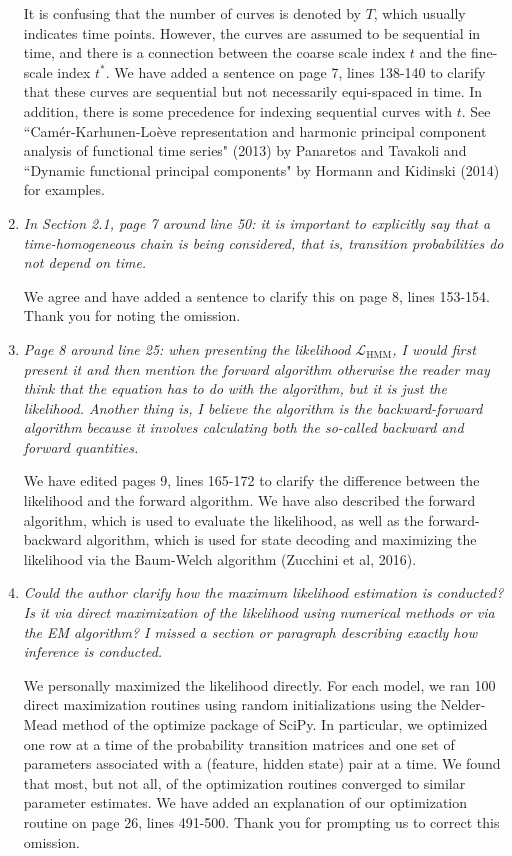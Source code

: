 \documentclass{article}
\begin{document}
\begin{enumerate}
    It is confusing that the number of curves is denoted by $T$, which usually indicates time points. However, the curves are assumed to be sequential in time, and there is a connection between the coarse scale index $t$ and the fine-scale index $t^*$. We have added a sentence on page 7, lines 138-140 to clarify that these curves are sequential but not necessarily equi-spaced in time. In addition, there is some precedence for indexing sequential curves with $t$. See ``Cam\'er-Karhunen-Lo\`eve representation and harmonic principal component analysis of functional time series" (2013) by Panaretos and Tavakoli and ``Dynamic functional principal components" by Hormann and Kidinski (2014) for examples.
    
    \item \textit{In Section 2.1, page 7 around line 50: it is important to explicitly say that a time-homogeneous chain is being considered, that is, transition probabilities do not depend on time.}
    
    We agree and have added a sentence to clarify this on page 8, lines 153-154. Thank you for noting the omission.
    
    \item \textit{Page 8 around line 25: when presenting the likelihood $\mathcal{L}_{\text{HMM}}$, I would first present it and then mention the forward algorithm otherwise the reader may think that the equation has to do with the algorithm, but it is just the likelihood. Another thing is, I believe the algorithm is the backward-forward algorithm because it involves calculating both the so-called backward and forward quantities.}
    
    We have edited pages 9, lines 165-172 to clarify the difference between the likelihood and the forward algorithm. We have also described the forward algorithm, which is used to evaluate the likelihood, as well as the forward-backward algorithm, which is used for state decoding and maximizing the likelihood via the Baum-Welch algorithm (Zucchini et al, 2016).
    
    \item \textit{Could the author clarify how the maximum likelihood estimation is conducted? Is it via direct maximization of the likelihood using numerical methods or via the EM algorithm? I missed a section or paragraph describing exactly how inference is conducted. }
    
    We personally maximized the likelihood directly. For each model, we ran 100 direct maximization routines using random initializations using the Nelder-Mead method of the optimize package of SciPy. In particular, we optimized one row at a time of the probability transition matrices and one set of parameters associated with a (feature, hidden state) pair at a time. We found that most, but not all, of the optimization routines converged to similar parameter estimates. We have added an explanation of our optimization routine on page 26, lines 491-500. Thank you for prompting us to correct this omission.
    

\end{enumerate}
\end{document}
